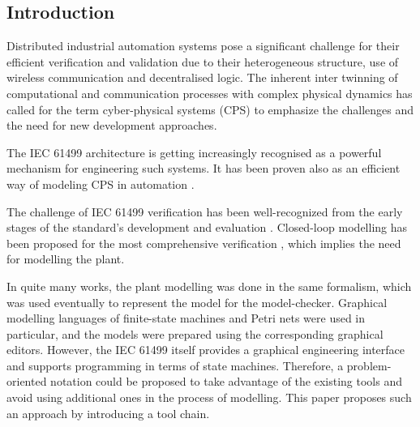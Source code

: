 \begin{bibunit}
\thispagestyle{plain}

\newcommand \op[1] {\ensuremath{\operatorname{\mathbf{#1}}}}
\newcommand \com[1] {\ensuremath{\mathtt{#1}}}
\newcommand{\RNum}[1]{\uppercase\expandafter{\romannumeral #1\relax}}

\section{Introduction}

Distributed industrial automation systems pose a significant challenge for their efficient verification and validation due to their heterogeneous structure, use of wireless communication and decentralised logic. The inherent inter twinning of computational and communication processes with complex physical dynamics has called for the term cyber-physical systems (CPS) \cite{lee2017introduction} to emphasize the challenges and the need for new development approaches.   

The {IEC 61499} architecture \cite{iec61499part12012} is getting increasingly recognised as a powerful mechanism for engineering such systems. 
It has been proven also as an efficient way of modeling CPS in automation \cite{dai2017discrete}. 

The challenge of IEC 61499 verification has been well-recognized from the early stages of the standard's development and evaluation \cite{vyatkin1999modeling}. Closed-loop modelling has been proposed for the most comprehensive verification \cite{vyatkin2008closed}, which implies the need for modelling the plant. 

In quite many works, the plant modelling \cite{buzhinsky2016plant} was done in the same formalism, which was used eventually to represent the model for the model-checker. Graphical modelling languages of finite-state machines and Petri nets \cite{berthomieu1991modeling} were used in particular, and the models were prepared using the corresponding graphical editors.
However, the IEC 61499 itself provides a graphical engineering interface and supports programming in terms of state machines. Therefore, a problem-oriented notation could be proposed to take advantage of the existing tools and avoid using additional ones in the process of modelling. This paper proposes such an approach by introducing a tool chain.



\end{bibunit}
